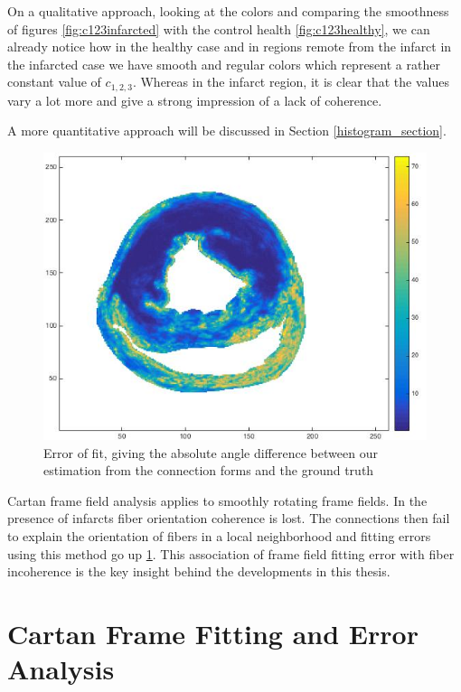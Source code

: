 On a qualitative approach, looking at the colors and comparing the smoothness of figures \ref{fig:c123infarcted} with the control health \ref{fig:c123healthy}, we can already notice how in the healthy case and in regions remote from the infarct in the infarcted case we have smooth and regular colors which represent a rather constant value of $c_{1,2,3}$. Whereas in the infarct region, it is clear that the values vary a lot more and give a strong impression of a lack of coherence.

A more quantitative approach will be discussed in Section \ref{histogram_section}.
 
\begin{figure}
    \centering
    \includegraphics[width=\textwidth]{figures/pig4_error_of_fit_slice_19}
    \caption{Error of fit, giving the absolute angle difference between our estimation from the connection forms and the ground truth}
    \label{fig:error_of_fit}
\end{figure}
 
Cartan frame field analysis applies to smoothly rotating frame fields. In the presence of infarcts fiber orientation coherence is lost. The connections then fail to explain the orientation of fibers in a local neighborhood and fitting errors using this method go up \ref{fig:error_of_fit}. This association of frame field fitting error with fiber incoherence is the key insight behind the developments in this thesis.

\section{Cartan Frame Fitting and Error Analysis}

